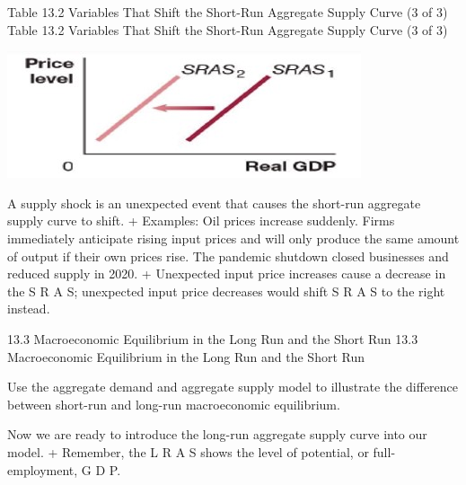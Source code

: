 \documentclass[
  12pt,
  ignorenonframetext,
]{beamer}
\begin{document}
\begin{frame}{Table 13.2 Variables That Shift the Short-Run Aggregate
Supply Curve (3 of 3)}
\protect\hypertarget{table-13.2-variables-that-shift-the-short-run-aggregate-supply-curve-3-of-3}{}
Table 13.2 Variables That Shift the Short-Run Aggregate Supply Curve (3
of 3)

\includegraphics[width=\textwidth,height=0.99\textheight]{imgs3/img_slide29a.png}

A supply shock is an unexpected event that causes the short-run
aggregate supply curve to shift. + Examples: Oil prices increase
suddenly. Firms immediately anticipate rising input prices and will only
produce the same amount of output if their own prices rise. The pandemic
shutdown closed businesses and reduced supply in 2020. + Unexpected
input price increases cause a decrease in the S R A S; unexpected input
price decreases would shift S R A S to the right instead.
\end{frame}

\begin{frame}{13.3 Macroeconomic Equilibrium in the Long Run and the
Short Run}
\protect\hypertarget{macroeconomic-equilibrium-in-the-long-run-and-the-short-run}{}
13.3 Macroeconomic Equilibrium in the Long Run and the Short Run

Use the aggregate demand and aggregate supply model to illustrate the
difference between short-run and long-run macroeconomic equilibrium.

Now we are ready to introduce the long-run aggregate supply curve into
our model. + Remember, the L R A S shows the level of potential, or
full-employment, G D P.
\end{frame}
\end{document}
